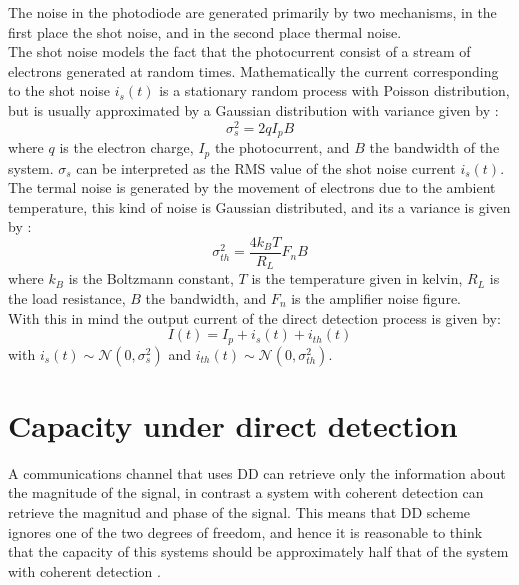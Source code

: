 The noise in the photodiode are generated primarily by two mechanisms, in the first place the shot noise, and in the second place thermal noise.\\

The shot noise models the fact that the photocurrent consist of a stream of electrons generated at random times. Mathematically the current corresponding to the shot noise $i_s(t)$ is a stationary random process with Poisson distribution, but is usually approximated by a Gaussian distribution with variance given by \cite{Agrawal_ch4}:
\begin{equation}
\sigma_s^2 = 2qI_pB
\label{eq:shot_noise_varaince}
\end{equation}
where $q$ is the electron charge, $I_p$ the photocurrent, and $B$ the bandwidth of the system. $\sigma_s$ can be interpreted as the RMS value of the shot noise current $i_s(t)$.\\ 

The termal noise is generated by the movement  of electrons due to the ambient temperature, this kind of noise is Gaussian distributed, and its a variance  is given by \cite{Agrawal_ch4}:
\begin{equation}
\sigma_{th}^2 = \frac{4k_BT}{R_L} F_nB
\label{eq:thermal_noise_variance}
\end{equation}
where $k_B$ is the Boltzmann constant, $T$ is the temperature given in kelvin, $R_L$ is the load resistance, $B$ the bandwidth, and $F_n$ is the amplifier noise figure. \\

With this in mind the output current of the direct detection process is given by:
\begin{equation}
I(t) = I_p+i_s(t)+i_{th}(t)
\label{eq:DD_current}
\end{equation}
with $i_s(t)\sim\mathcal{N}(0,\sigma_s^2)$ and $i_{th}(t)\sim\mathcal{N}(0,\sigma_{th}^2)$.


\section{Capacity under direct detection}
\label{sec:capacity_under_direct_detection}

A communications channel that uses DD can retrieve only the information about the magnitude of the signal, in contrast a system with coherent detection can retrieve the magnitud and phase of the signal. This means that DD scheme ignores one of the two degrees of freedom, and hence it is reasonable to think that the capacity of this systems should be approximately half that of the system with coherent detection \cite{Mecozzi_2018, Tasbihi_Tukey, Tasbihi_Capacity}.\\

